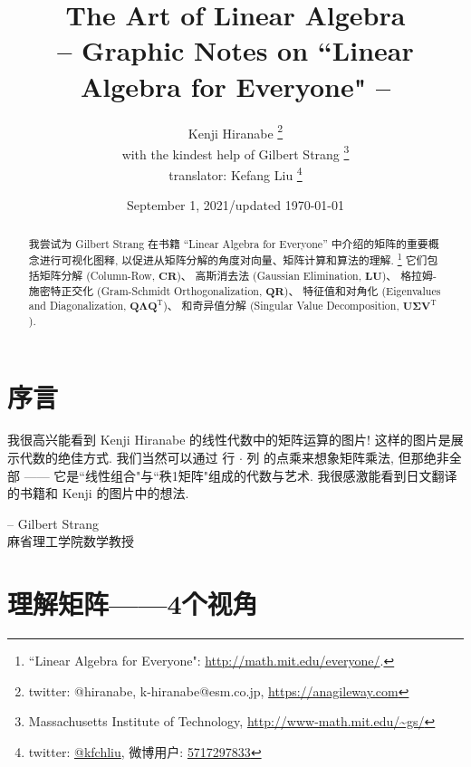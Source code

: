 \documentclass[letterpaper]{article}
\DeclareRobustCommand\transp{^{\mathrm{T}}}
\begin{document}
\title{The Art of Linear Algebra\\
\vspace{5pt}
\large{
-- Graphic Notes on ``Linear Algebra for Everyone" --
}
}

\author{Kenji Hiranabe
\thanks{twitter: @hiranabe, k-hiranabe@esm.co.jp, \url{https://anagileway.com}} \\
with the kindest help of Gilbert Strang
\thanks{Massachusetts Institute of Technology, \url{http://www-math.mit.edu/\~gs/}} \\
translator: Kefang Liu
\thanks{twitter: \href{https://twitter.com/KFChLiu}{@kfchliu}, 微博用户: \href{https://weibo.com/u/5717297833}{5717297833}}
}

\date{September 1, 2021/updated \today}

\maketitle

\vspace{-5pt}
 
\begin{abstract}
我尝试为 Gilbert Strang 在书籍 “Linear Algebra for Everyone” 中介绍的矩阵的重要概念进行可视化图释, 
以促进从矩阵分解的角度对向量、矩阵计算和算法的理解.
\footnote{``Linear Algebra for Everyone": 
\url{http://math.mit.edu/everyone/}.}
它们包括矩阵分解 (Column-Row, $\bm{CR}$)、
高斯消去法 (Gaussian Elimination, $\bm{LU}$)、
格拉姆-施密特正交化 (Gram-Schmidt Orthogonalization, $\bm{QR}$)、
特征值和对角化 (Eigenvalues and Diagonalization, $\bm{Q \Lambda Q\transp}$)、
和奇异值分解 (Singular Value Decomposition, $\bm{U \Sigma V\transp}$).
\end{abstract}

\section*{序言}
我很高兴能看到 Kenji Hiranabe 的线性代数中的矩阵运算的图片! 
这样的图片是展示代数的绝佳方式. 我们当然可以通过 行 $\bm{\cdot}$ 列 的点乘来想象矩阵乘法, 
但那绝非全部 —— 它是``线性组合"与``秩1矩阵"组成的代数与艺术. 
我很感激能看到日文翻译的书籍和 Kenji 的图片中的想法. 
\begin{flushright}
-- Gilbert Strang \\ 麻省理工学院数学教授
\end{flushright}

\tableofcontents

\section{理解矩阵——4个视角}
\end{document}
